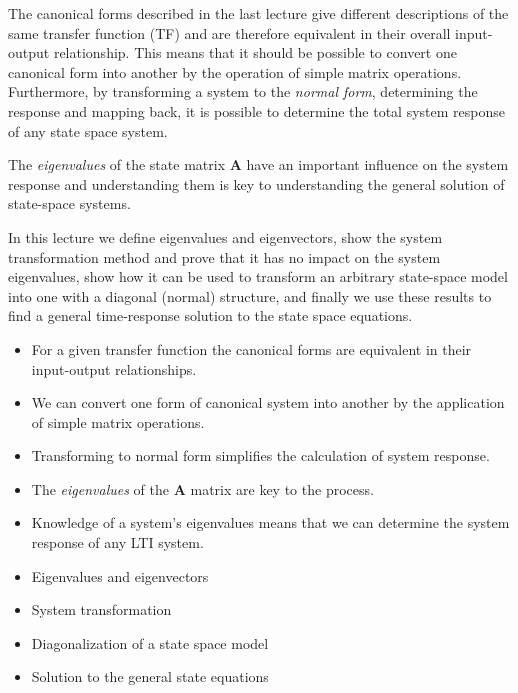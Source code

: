 \def\FileDate{10/01/31}
\def\FileVersion{1.0}


The canonical forms described in the last lecture give different descriptions of the same transfer function (TF) and are therefore equivalent in their overall input-output relationship. This means that it should be possible to convert one canonical form into another by the operation of simple matrix operations. Furthermore, by transforming a system to the \emph{normal form}, determining the response and mapping back, it is possible to determine the total system response of any state space system.

The \emph{eigenvalues} of the state matrix $\mathbf{A}$ have an important influence on the system response and understanding them is key to understanding the general solution of state-space systems.

In this lecture we define eigenvalues and eigenvectors, show the system transformation method and prove that it has no impact on the system eigenvalues, show how it can be used to transform an arbitrary state-space model into one with a diagonal (normal) structure, and finally we use these results to find a general time-response solution to the state space equations.

\ifslidesonly
\begin{slide}
\begin{itemize}
	\item For a given transfer function the canonical forms are equivalent in their input-output relationships.
	\item We can convert one form of canonical system into another by the application of simple matrix operations.
	\item Transforming to normal form simplifies the calculation of system response.
	\item The \emph{eigenvalues} of the $\mathbf{A}$ matrix are key to the process.
	\item Knowledge of a system's eigenvalues means that we can determine the system response of any LTI system.
\end{itemize}
\end{slide}
\begin{slide}
\begin{itemize}
	\item Eigenvalues and eigenvectors
	\item System transformation
	\item Diagonalization of a state space model
	\item Solution to the general state equations
\end{itemize}
\end{slide}
\fi

